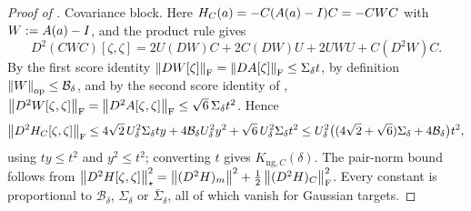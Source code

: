 \begin{proof}[Proof of ]
Covariance block. Here $H_C(a)=-C(A(a)-I)C=-CWC$ with $W:=A(a)-I$, and the product
rule gives
\[
    D^2(CWC)[\zeta,\zeta]=2U(DW)C+2C(DW)U+2UWU+C(D^2W)C .
\]
By the first score identity $\left\lVert DW[\zeta]\right\rVert_{\mathrm{F}}=\left\lVert DA[\zeta]\right\rVert_{\mathrm{F}}\leq\Sigma_\delta t$,
by definition $\left\lVert W\right\rVert_{\mathrm{op}}\leq\mathcal B_\delta$, and by the second score identity of
,
$\left\lVert D^2W[\zeta,\zeta]\right\rVert_{\mathrm{F}}=\left\lVert D^2A[\zeta,\zeta]\right\rVert_{\mathrm{F}}\leq\sqrt6\,\Sigma_\delta t^2$.
Hence
\[
    \left\lVert D^2H_C[\zeta,\zeta]\right\rVert_{\mathrm{F}}
    \leq4\sqrt2\,U_\delta^2\Sigma_\delta ty+4\mathcal B_\delta U_\delta^2y^2+\sqrt6\,U_\delta^2\Sigma_\delta t^2
    \leq U_\delta^2\bigl((4\sqrt2+\sqrt6)\Sigma_\delta+4\mathcal B_\delta\bigr)t^2,
\]
using $ty\leq t^2$ and $y^2\leq t^2$; converting $t$ gives $K_{\mathrm{ng},C}(\delta)$. The
pair-norm bound follows from
$\left\lVert D^2H[\zeta,\zeta]\right\rVert_\star^2=\left\lVert (D^2H)_m\right\rVert^2+\tfrac12\left\lVert (D^2H)_C\right\rVert_{\mathrm{F}}^2$. Every
constant is proportional to $\mathcal B_\delta$, $\Sigma_\delta$ or $\bar\Sigma_\delta$, all of
which vanish for Gaussian targets.
\end{proof}

%
